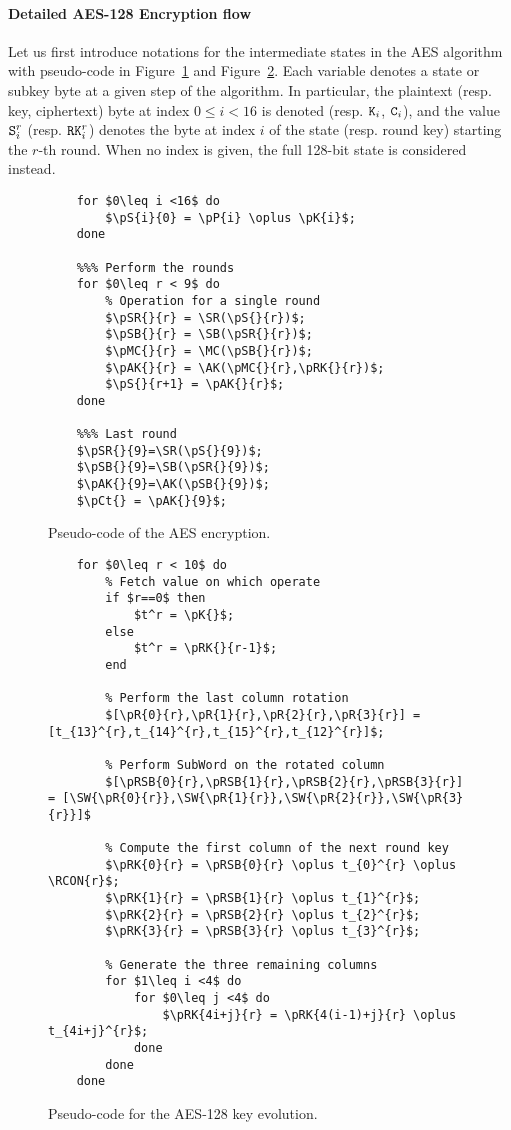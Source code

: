 \documentclass{scrartcl}
\begin{document}
\paragraph{Detailed AES-128 Encryption flow}
Let us first introduce notations for the intermediate states in the AES algorithm with
pseudo-code in Figure~\ref{fig:code_round} and Figure~\ref{fig:code_key}.
Each variable denotes a state or subkey byte at a given step of the algorithm.
In particular, the plaintext (resp. key, ciphertext) byte at index $0\leq i<16$
is denoted  (resp. $\texttt{K}_{i}$, $\texttt{C}_{i}$), and the value $\texttt{S}_{i}^{r}$ (resp.
$\texttt{RK}_{i}^{r}$) denotes the byte at index $i$ of the state (resp. round key)
starting the $r$-th round.
When no index is given, the full 128-bit state is considered instead.

\begin{figure}
    \begin{lstlisting}[frame=single]
    %%% First key addition
    for $0\leq i <16$ do
        $\pS{i}{0} = \pP{i} \oplus \pK{i}$;
    done
    
    %%% Perform the rounds
    for $0\leq r < 9$ do 
        % Operation for a single round
        $\pSR{}{r} = \SR(\pS{}{r})$;
        $\pSB{}{r} = \SB(\pSR{}{r})$;
        $\pMC{}{r} = \MC(\pSB{}{r})$;
        $\pAK{}{r} = \AK(\pMC{}{r},\pRK{}{r})$;
        $\pS{}{r+1} = \pAK{}{r}$;
    done
    
    %%% Last round
    $\pSR{}{9}=\SR(\pS{}{9})$;
    $\pSB{}{9}=\SB(\pSR{}{9})$;
    $\pAK{}{9}=\AK(\pSB{}{9})$;
    $\pCt{} = \pAK{}{9}$;
    \end{lstlisting}
    \caption{Pseudo-code of the AES encryption.}
    \label{fig:code_round}
\end{figure}


\begin{figure}
    \begin{lstlisting}[frame=single]
    %%% Key evolution for each round key 
    for $0\leq r < 10$ do
        % Fetch value on which operate
        if $r==0$ then
            $t^r = \pK{}$; 
        else 
            $t^r = \pRK{}{r-1}$;
        end

        % Perform the last column rotation
        $[\pR{0}{r},\pR{1}{r},\pR{2}{r},\pR{3}{r}] = [t_{13}^{r},t_{14}^{r},t_{15}^{r},t_{12}^{r}]$; 

        % Perform SubWord on the rotated column
        $[\pRSB{0}{r},\pRSB{1}{r},\pRSB{2}{r},\pRSB{3}{r}] = [\SW{\pR{0}{r}},\SW{\pR{1}{r}},\SW{\pR{2}{r}},\SW{\pR{3}{r}}]$

        % Compute the first column of the next round key
        $\pRK{0}{r} = \pRSB{0}{r} \oplus t_{0}^{r} \oplus \RCON{r}$;
        $\pRK{1}{r} = \pRSB{1}{r} \oplus t_{1}^{r}$;
        $\pRK{2}{r} = \pRSB{2}{r} \oplus t_{2}^{r}$;
        $\pRK{3}{r} = \pRSB{3}{r} \oplus t_{3}^{r}$;

        % Generate the three remaining columns
        for $1\leq i <4$ do
            for $0\leq j <4$ do
                $\pRK{4i+j}{r} = \pRK{4(i-1)+j}{r} \oplus t_{4i+j}^{r}$;
            done
        done
    done
    \end{lstlisting}
    \caption{Pseudo-code for the AES-128 key evolution.}
    \label{fig:code_key}
\end{figure}
\end{document}
